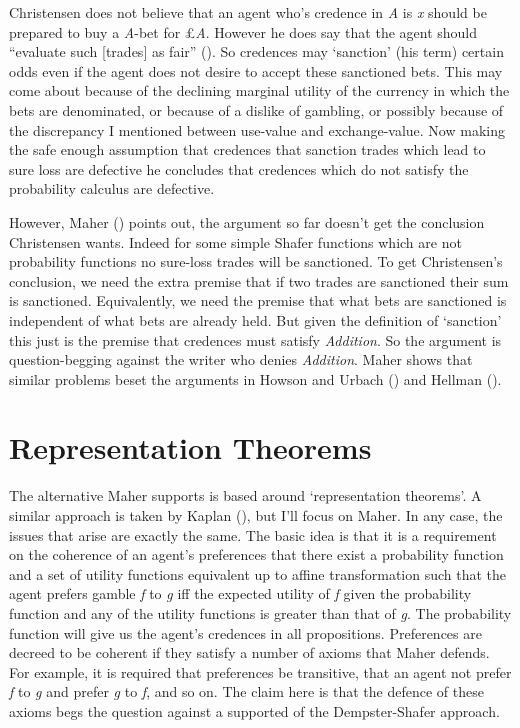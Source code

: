 \documentclass[
  10pt,
  letterpaper,
  DIV=11,
  numbers=noendperiod,
  twoside]{scrartcl}
\begin{document}
Christensen does not believe that an agent who's credence in \emph{A} is
\emph{x} should be prepared to buy a \emph{A}-bet for £\emph{A}. However
he does say that the agent should ``evaluate such {[}trades{]} as fair''
(). So credences
may `sanction' (his term) certain odds even if the agent does not desire
to accept these sanctioned bets. This may come about because of the
declining marginal utility of the currency in which the bets are
denominated, or because of a dislike of gambling, or possibly because of
the discrepancy I mentioned between use-value and exchange-value. Now
making the safe enough assumption that credences that sanction trades
which lead to sure loss are defective he concludes that credences which
do not satisfy the probability calculus are defective.

However, Maher () points out, the
argument so far doesn't get the conclusion Christensen wants. Indeed for
some simple Shafer functions which are not probability functions no
sure-loss trades will be sanctioned. To get Christensen's conclusion, we
need the extra premise that if two trades are sanctioned their sum is
sanctioned. Equivalently, we need the premise that what bets are
sanctioned is independent of what bets are already held. But given the
definition of `sanction' this just is the premise that credences must
satisfy \emph{Addition}. So the argument is question-begging against the
writer who denies \emph{Addition}. Maher shows that similar problems
beset the arguments in Howson and Urbach
() and Hellman
().

\section{Representation Theorems}\label{representation-theorems}

The alternative Maher supports is based around `representation
theorems'. A similar approach is taken by Kaplan
(), but I'll focus on Maher. In any case,
the issues that arise are exactly the same. The basic idea is that it is
a requirement on the coherence of an agent's preferences that there
exist a probability function and a set of utility functions equivalent
up to affine transformation such that the agent prefers gamble \emph{f}
to \emph{g} iff the expected utility of \emph{f} given the probability
function and any of the utility functions is greater than that of
\emph{g}. The probability function will give us the agent's credences in
all propositions. Preferences are decreed to be coherent if they satisfy
a number of axioms that Maher defends. For example, it is required that
preferences be transitive, that an agent not prefer \emph{f} to \emph{g}
and prefer \emph{g} to \emph{f}, and so on. The claim here is that the
defence of these axioms begs the question against a supported of the
Dempster-Shafer approach.
\end{document}
